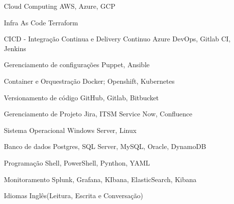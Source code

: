 

\begin{cvskills}

  \cvskill
    {Cloud Computing} %
    {AWS, Azure, GCP} %

  \cvskill
    {Infra As Code} %
    {Terraform} %

  \cvskill
    {CICD - Integração Continua e Delivery Continuo} %
    {Azure DevOps, Gitlab CI, Jenkins} %

  \cvskill
    {Gerenciamento de configurações} %
    {Puppet, Ansible} %

  \cvskill
    {Container e Orquestração} %
    {Docker; Openshift, Kubernetes} %

  \cvskill
    {Versionamento de código} %
    {GitHub, Gitlab, Bitbucket} %

  \cvskill
    {Gerenciamento de Projeto} %
    {Jira, ITSM Service Now, Confluence} %

  \cvskill
    {Sistema Operacional} %
    {Windows Server, Linux} %

  \cvskill
    {Banco de dados} %
    {Postgres, SQL Server, MySQL, Oracle, DynamoDB} %

  \cvskill
    {Programação} %
    {Shell, PowerShell, Pynthon, YAML} %

  \cvskill
    {Monitoramento} %
    {Splunk, Grafana, KIbana, ElasticSearch, Kibana} %

  \cvskill
    {Idiomas} %
    {Inglês(Leitura, Escrita e Conversação)} %

\end{cvskills}